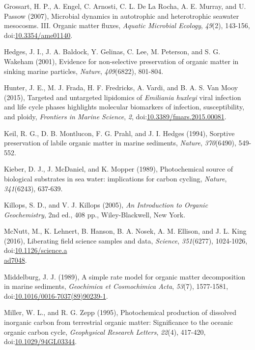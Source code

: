 \begin{singlespace}
{{Grossart, H. P., A. Engel, C. Arnosti, C. L. De La Rocha, A. E. Murray,
and U. Passow (2007), Microbial dynamics in autotrophic and
heterotrophic seawater mesocosms. III. Organic matter fluxes,
\emph{Aquatic Microbial Ecology}, \emph{49}(2), 143-156,
doi:\href{http://dx.doi.org/10.3354/ame01140}{10.3354/ame01140}.

Hedges, J. I., J. A. Baldock, Y. Gelinas, C. Lee, M. Peterson, and S. G.
Wakeham (2001), Evidence for non-selective preservation of organic
matter in sinking marine particles, \emph{Nature}, \emph{409}(6822),
801-804.

Hunter, J. E., M. J. Frada, H. F. Fredricks, A. Vardi, and B. A. S. Van
Mooy (2015), Targeted and untargeted lipidomics of \emph{Emiliania huxleyi}
viral infection and life cycle phases highlights molecular biomarkers of
infection, susceptibility, and ploidy, \emph{Frontiers in Marine
Science}, \emph{2}, doi:\href{http://dx.doi.org/10.3389/fmars.2015.00081}{10.3389/fmars.2015.00081}.

Keil, R. G., D. B. Montlucon, F. G. Prahl, and J. I. Hedges (1994),
Sorptive preservation of labile organic matter in marine sediments,
\emph{Nature}, \emph{370}(6490), 549-552.

Kieber, D. J., J. McDaniel, and K. Mopper (1989), Photochemical source
of biological substrates in sea water: implications for carbon cycling,
\emph{Nature}, \emph{341}(6243), 637-639.

Killops, S. D., and V. J. Killops (2005), \emph{An Introduction to
Organic Geochemistry}, 2nd ed., 408 pp., Wiley-Blackwell, New York.

McNutt, M., K. Lehnert, B. Hanson, B. A. Nosek, A. M. Ellison, and J. L.
King (2016), Liberating field science samples and data, \emph{Science},
\emph{351}(6277), 1024-1026, doi:\href{http://dx.doi.org/10.1126/science.aad7048}{10.1126/science.a\\ad7048}.

Middelburg, J. J. (1989), A simple rate model for organic matter
decomposition in marine sediments, \emph{Geochimica et Cosmochimica Acta},
\emph{53}(7), 1577-1581, doi:\href{http://dx.doi.org/10.1016/0016-7037(89)90239-1}{10.1016/0016-7037(89)90239-1}.

Miller, W. L., and R. G. Zepp (1995), Photochemical production of
dissolved inorganic carbon from terrestrial organic matter: Significance
to the oceanic organic carbon cycle, \emph{Geophysical Research Letters},
\emph{22}(4), 417-420, doi:\href{http://dx.doi.org/10.1029/94GL03344}{10.1029/94GL03344}.

}}
\end{singlespace}
